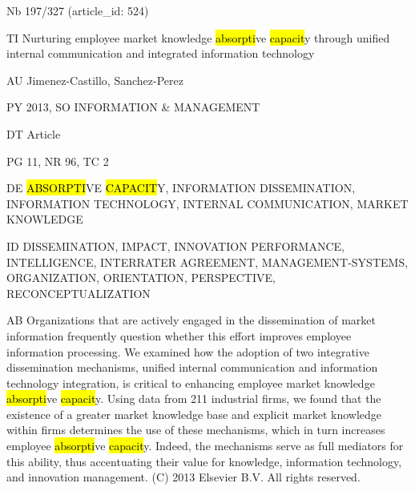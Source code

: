 \documentclass[a4paper]{article}
\begin{document}
\vspace*{-2cm}
Nb \tabto{0cm}197/327 (article\_id: 524)\par
TI \tabto{0cm}Nurturing employee market knowledge \hl{absorpti}ve \hl{capacit}y through unified internal communication and integrated information technology\par
AU \tabto{0cm}Jimenez-Castillo, Sanchez-Perez\par
PY \tabto{0cm}2013, SO INFORMATION \& MANAGEMENT\par
DT \tabto{0cm}Article\par
PG \tabto{0cm}11, NR 96, TC 2\par
DE \tabto{0cm}\hl{ABSORPTI}VE \hl{CAPACIT}Y, INFORMATION DISSEMINATION, INFORMATION TECHNOLOGY, INTERNAL COMMUNICATION, MARKET KNOWLEDGE\par
ID \tabto{0cm}DISSEMINATION, IMPACT, INNOVATION PERFORMANCE, INTELLIGENCE, INTERRATER AGREEMENT, MANAGEMENT-SYSTEMS, ORGANIZATION, ORIENTATION, PERSPECTIVE, RECONCEPTUALIZATION\par
AB \tabto{0cm}Organizations that are actively engaged in the dissemination of market information frequently question whether this effort improves employee information processing. We examined how the adoption of two integrative dissemination mechanisms, unified internal communication and information technology integration, is critical to enhancing employee market knowledge \hl{absorpti}ve \hl{capacit}y. Using data from 211 industrial firms, we found that the existence of a greater market knowledge base and explicit market knowledge within firms determines the use of these mechanisms, which in turn increases employee \hl{absorpti}ve \hl{capacit}y. Indeed, the mechanisms serve as full mediators for this ability, thus accentuating their value for knowledge, information technology, and innovation management. (C) 2013 Elsevier B.V. All rights reserved.\par
\clearpage
\end{document}
